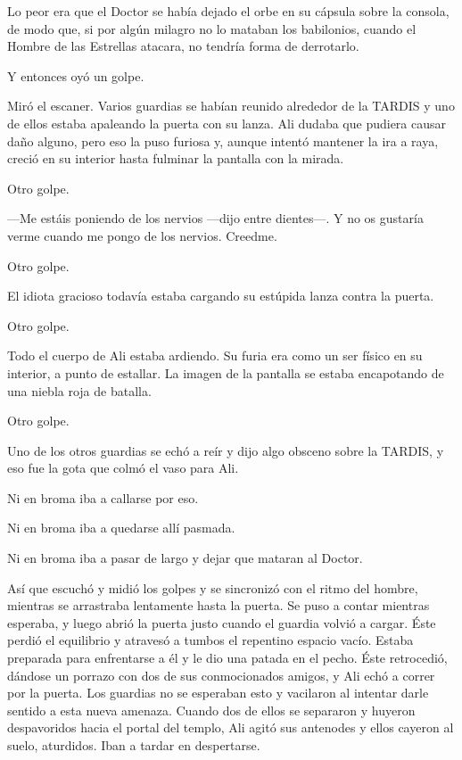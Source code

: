 Lo peor era que el Doctor se había dejado el orbe en su cápsula sobre la
consola, de modo que, si por algún milagro no lo mataban los babilonios,
cuando el Hombre de las Estrellas atacara, no tendría forma de
derrotarlo.

Y entonces oyó un golpe.

Miró el escaner. Varios guardias se habían reunido alrededor de la
TARDIS y uno de ellos estaba apaleando la puerta con su lanza. Ali
dudaba que pudiera causar daño alguno, pero eso la puso furiosa y,
aunque intentó mantener la ira a raya, creció en su interior hasta
fulminar la pantalla con la mirada.

Otro golpe.

---Me estáis poniendo de los nervios ---dijo entre dientes---. Y no os
gustaría verme cuando me pongo de los nervios. Creedme.

Otro golpe.

El idiota gracioso todavía estaba cargando su estúpida lanza contra la
puerta.

Otro golpe.

Todo el cuerpo de Ali estaba ardiendo. Su furia era como un ser físico
en su interior, a punto de estallar. La imagen de la pantalla se estaba
encapotando de una niebla roja de batalla.

Otro golpe.

Uno de los otros guardias se echó a reír y dijo algo obsceno sobre la
TARDIS, y eso fue la gota que colmó el vaso para Ali.

Ni en broma iba a callarse por eso.

Ni en broma iba a quedarse allí pasmada.

Ni en broma iba a pasar de largo y dejar que mataran al Doctor.

Así que escuchó y midió los golpes y se sincronizó con el ritmo del
hombre, mientras se arrastraba lentamente hasta la puerta. Se puso a
contar mientras esperaba, y luego abrió la puerta justo cuando el
guardia volvió a cargar. Éste perdió el equilibrio y atravesó a tumbos
el repentino espacio vacío. Estaba preparada para enfrentarse a él y le
dio una patada en el pecho. Éste retrocedió, dándose un porrazo con dos
de sus conmocionados amigos, y Ali echó a correr por la puerta. Los
guardias no se esperaban esto y vacilaron al intentar darle sentido a
esta nueva amenaza. Cuando dos de ellos se separaron y huyeron
despavoridos hacia el portal del templo, Ali agitó sus antenodes y ellos
cayeron al suelo, aturdidos. Iban a tardar en despertarse.

